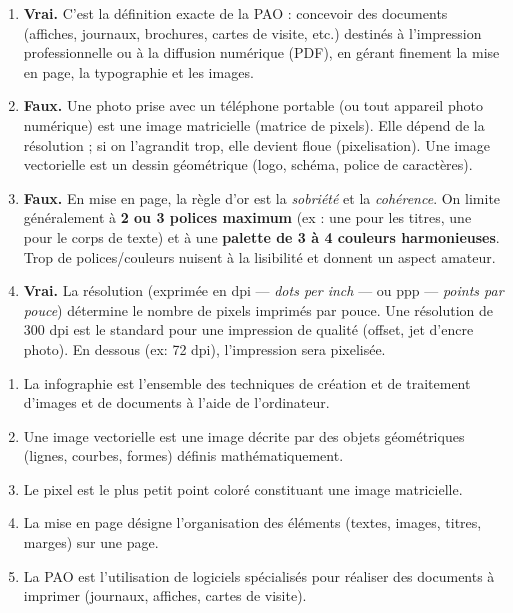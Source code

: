 \documentclass[11pt]{article}
\newcommand{\cle}[1]{{\popxbold\color{popdark}#1}}
\begin{document}
\begin{corrige}
\begin{enumerate}
\item \textbf{Vrai.} C'est la définition exacte de la \cle{PAO} : concevoir des documents (affiches, journaux, brochures, cartes de visite, etc.) destinés à l'impression professionnelle ou à la diffusion numérique (PDF), en gérant finement la mise en page, la typographie et les images.
\item \textbf{Faux.} Une photo prise avec un téléphone portable (ou tout appareil photo numérique) est une image \cle{matricielle} (matrice de pixels). Elle dépend de la résolution ; si on l'agrandit trop, elle devient floue (pixelisation). Une image vectorielle est un dessin géométrique (logo, schéma, police de caractères).
\item \textbf{Faux.} En mise en page, la règle d'or est la \emph{sobriété} et la \emph{cohérence}. On limite généralement à \textbf{2 ou 3 polices maximum} (ex : une pour les titres, une pour le corps de texte) et à une \textbf{palette de 3 à 4 couleurs harmonieuses}. Trop de polices/couleurs nuisent à la lisibilité et donnent un aspect amateur.
\item \textbf{Vrai.} La résolution (exprimée en \cle{dpi} — \emph{dots per inch} — ou ppp — \emph{points par pouce}) détermine le nombre de pixels imprimés par pouce. Une résolution de 300 dpi est le standard pour une impression de qualité (offset, jet d'encre photo). En dessous (ex: 72 dpi), l'impression sera pixelisée.
\end{enumerate}
\end{corrige}

\begin{corrige}
\begin{enumerate}
\item La \cle{infographie} est l'ensemble des techniques de création et de traitement d'images et de documents à l'aide de l'ordinateur.
\item Une \cle{image vectorielle} est une image décrite par des objets géométriques (lignes, courbes, formes) définis mathématiquement.
\item Le \cle{pixel} est le plus petit point coloré constituant une image matricielle.
\item La \cle{mise en page} désigne l'organisation des éléments (textes, images, titres, marges) sur une page.
\item La \cle{PAO} est l'utilisation de logiciels spécialisés pour réaliser des documents à imprimer (journaux, affiches, cartes de visite).
\end{enumerate}
\end{corrige}
\end{document}
